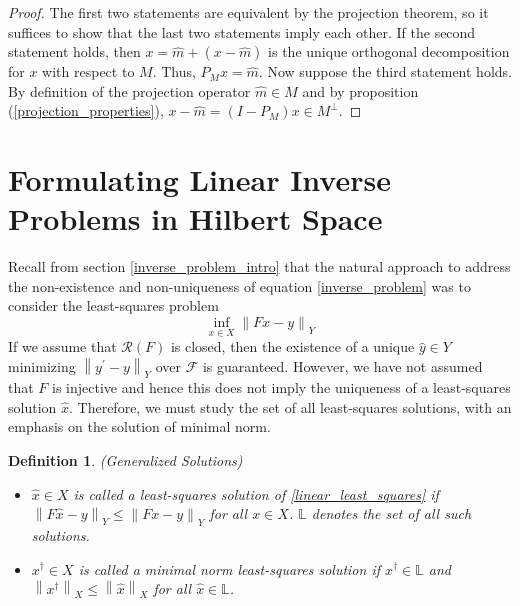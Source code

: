 \documentclass[12pt]{article}
\newcommand*{\norm}[1]{\left\lVert#1\right\rVert}
\newtheorem{definition}{Definition}
\begin{document}
\begin{proof} 
The first two statements are equivalent by the projection theorem, so it suffices to show that the last two 
statements imply each other. If the second statement holds, then $x = \hat{m} + (x - \hat{m})$ is the unique 
orthogonal decomposition for $x$ with respect to $M$. Thus, $P_M x = \hat{m}$. Now suppose the third 
statement holds. By definition of the projection operator $\hat{m} \in M$ and by proposition 
(\ref{projection_properties}),  $x - \hat{m} = (I - P_M)x \in M^\perp$. 
\end{proof} 

\section{Formulating Linear Inverse Problems in Hilbert Space} \label{formulation}

 Recall from section \ref{inverse_problem_intro} that the natural approach to address the non-existence 
 and non-uniqueness of equation \eqref{inverse_problem} was to consider the least-squares problem 
 \begin{equation} 
 \inf_{x \in X} \norm{Fx - y}_Y \label{linear_least_squares}
 \end{equation} 
If we assume that $\mathcal{R}(F)$ is closed, 
then the existence of a unique $\hat{y} \in Y$ minimizing $\norm{y^\prime - y}_Y$ 
 over $\mathcal{F}$ is guaranteed. However, we have not assumed that $F$ is injective and hence this does not 
 imply the uniqueness of a least-squares solution $\hat{x}$. Therefore, we must study the set of all 
 least-squares solutions, with an emphasis on the solution of minimal norm. 
 
 \begin{definition} 
(Generalized Solutions) 
 \begin{itemize}
 \item $\hat{x} \in X$ is called a least-squares solution of \eqref{linear_least_squares} if $\norm{F\hat{x} - y}_Y \leq \norm{Fx - y}_Y$ for all $x \in X$. $\mathbb{L}$ denotes the set of all such solutions. 
 \item $x^\dagger \in X$ is called a minimal norm least-squares solution if $x^\dagger \in \mathbb{L}$ and $\norm{x^\dagger}_X \leq \norm{\hat{x}}_X$ for all $\hat{x} \in \mathbb{L}$. 
 \end{itemize} 
\end{definition} 
\end{document}
